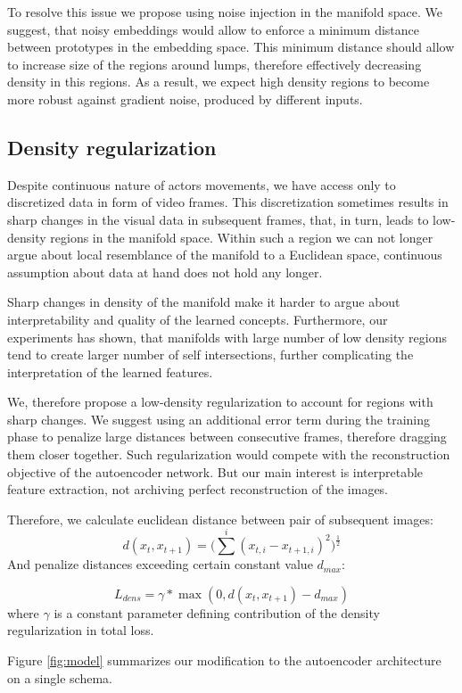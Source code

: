 To resolve this issue we propose using noise injection in the manifold space.
We suggest, that noisy embeddings would allow to enforce a minimum distance between prototypes in the embedding space.
This minimum distance should allow to increase size of the regions around lumps, therefore effectively decreasing density in this regions.
As a result, we expect high density regions to become more robust against gradient noise, produced by different inputs.



\subsection{Density regularization}

Despite continuous nature of actors movements, we have access only to discretized data in form of video frames.
This discretization sometimes results in sharp changes in the visual data in subsequent frames, that, in turn, leads to low-density regions in the manifold space.
Within such a region we can not longer argue about local resemblance of the manifold to a Euclidean space, continuous assumption about data at hand does not hold any longer.

Sharp changes in density of the manifold make it harder to argue about interpretability and quality of the learned concepts. Furthermore, our experiments has shown, that manifolds with large number of low density regions tend to create larger number of self intersections, further complicating the interpretation of the learned features.

We, therefore propose a low-density regularization to account for regions with sharp changes.
We suggest using an additional error term during the training phase to penalize large distances between consecutive frames, therefore dragging them closer together.
Such regularization would compete with the reconstruction objective of the autoencoder network.
But our main interest is interpretable feature extraction, not archiving perfect reconstruction of the images.

Therefore, we calculate euclidean distance between pair of subsequent images:
\begin{equation*}
d(x_t, x_{t+1}) = \Big(\sum^i { (x_{t,i}-x_{t+1, i})^2}\Big)^{\frac{1}{2}}
\end{equation*}
And penalize distances exceeding certain constant value $d_{max}$:

\begin{equation*}
  L_{dens} = \gamma*\max(0, d(x_t, x_{t+1})-d_{max})
\end{equation*}
where $\gamma$ is a constant parameter defining contribution of the density regularization in total loss.


Figure \ref{fig:model} summarizes our modification to the autoencoder architecture on a single schema.


